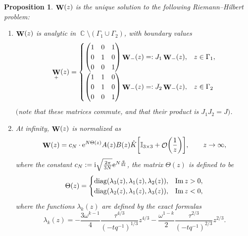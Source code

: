 \documentclass[pdftex]{sigma}
\DeclareMathOperator{\CC}{\mathbb{C}}
\DeclareMathOperator{\OO}{\mathcal{O}}
\DeclareMathOperator{\WW}{{\bf W}}
\numberwithin{equation}{section}
\newtheorem{Proposition}[Theorem]{Proposition}
 { \theoremstyle{definition}
\newtheorem{Definition}[Theorem]{Definition}
\newtheorem{Note}[Theorem]{Note}
\newtheorem{Example}[Theorem]{Example}
\newtheorem{Remark}[Theorem]{Remark} }
\begin{document}
 \begin{Proposition} $\WW(z)$ is the unique solution to the following Riemann--Hilbert problem:
 \begin{enumerate}\itemsep=0pt
 \item[$(1)$] $\WW(z)$ is analytic in $\CC \setminus (\Gamma_1\cup \Gamma_2)$, with boundary values
 \begin{equation*}
 \WW_{+}(z) =
 \begin{cases}
 \begin{pmatrix}
 1 & 0 & 1 \\
 0 & 1 & 0 \\
 0 & 0 & 1
 \end{pmatrix}\WW_{-}(z) =: J_1\WW_{-}(z), & z \in \Gamma_1,\\[1.5mm]
 \begin{pmatrix}
 1 & 1 & 0 \\
 0 & 1 & 0 \\
 0 & 0 & 1
 \end{pmatrix}\WW_{-}(z)=: J_2\WW_{-}(z), & z \in \Gamma_2
 \end{cases}
 \end{equation*}
 $($note that these matrices commute, and that their product is $J_1J_2=J)$.
 \item[$(2)$] At infinity, $\WW(z)$ is normalized as
 \begin{equation*}
 \WW(z) = c_N \cdot {\rm e}^{N\Theta(z)} A(z) B(z)\hat{K}\biggl[\mathbb{I}_{3\times 3} + \OO\biggl(\frac{1}{z}\biggr)\biggr], \qquad z\to \infty,
 \end{equation*}
 where the constant $c_N:= {\rm i}\sqrt{\frac{2\pi}{3N}}{\rm e}^{N\frac{q}{6t}}$, the matrix $\Theta(z)$ is defined to be
 \begin{equation} \label{Lambda-Matrix}
 \Theta(z) =
 \begin{cases}
 {\rm diag}(\lambda_3(z), \lambda_1(z),\lambda_2(z)), & \operatorname{Im} z > 0,\\
 {\rm diag}(\lambda_2(z), \lambda_1(z),\lambda_3(z)), & \operatorname{Im} z <0,
 \end{cases} %
 \end{equation}
where the functions $\lambda_k(z)$ are defined by the \textit{exact} formulas
 \begin{equation*}%
 \lambda_k(z) = -\frac{3\omega^{k-1}}{4} \frac{\tau^{4/3}}{(-tq^{-1})^{1/3}}z^{4/3} - \frac{\omega^{1-k}}{2}\frac{\tau^{2/3}}{(-tq^{-1})^{2/3}}z^{2/3}.
 \end{equation*}

\end{enumerate}
\end{Proposition}
\end{document}
